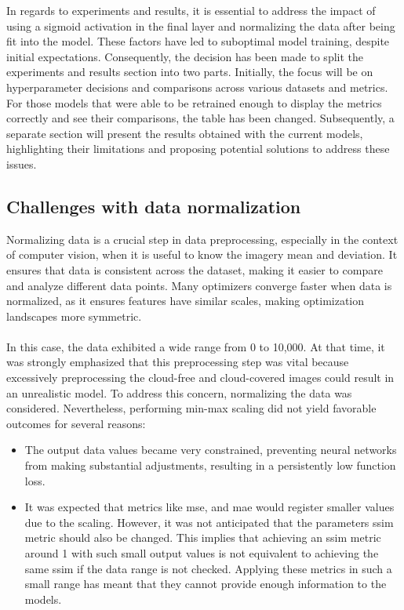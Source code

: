 In regards to experiments and results, it is essential to address the impact of using a sigmoid activation in the final layer and normalizing the data after being fit into the model. These factors have led to suboptimal model training, despite initial expectations. Consequently, the decision has been made to split the experiments and results section into two parts. Initially, the focus will be on hyperparameter decisions and comparisons across various datasets and metrics. For those models that were able to be retrained enough to display the metrics correctly and see their comparisons, the table has been changed. Subsequently, a separate section will present the results obtained with the current models, highlighting their limitations and proposing potential solutions to address these issues.

\subsection{Challenges with data normalization}
Normalizing data is a crucial step in data preprocessing, especially in the context of computer vision, when it is useful to know the imagery mean and deviation. It ensures that data is consistent across the dataset, making it easier to compare and analyze different data points. Many optimizers converge faster when data is normalized, as it ensures features have similar scales, making optimization landscapes more symmetric.
\\
\\
In this case, the data exhibited a wide range from 0 to 10,000. At that time, it was strongly emphasized that this preprocessing step was vital because excessively preprocessing the cloud-free and cloud-covered images could result in an unrealistic model. To address this concern, normalizing the data was considered. Nevertheless, performing min-max scaling did not yield favorable outcomes for several reasons:
\begin{itemize}
	\item The output data values became very constrained, preventing neural networks from making substantial adjustments, resulting in a persistently low function loss. 
	\item It was expected that metrics like \gls{mse}, and \gls{mae} would register smaller values due to the scaling. However, it was not anticipated that the parameters \gls{ssim} metric should also be changed. This implies that achieving an \gls{ssim} metric around 1 with such small output values is not equivalent to achieving the same \gls{ssim} if the data range is not checked. Applying these metrics in such a small range has meant that they cannot provide enough information to the models.
\end{itemize}

